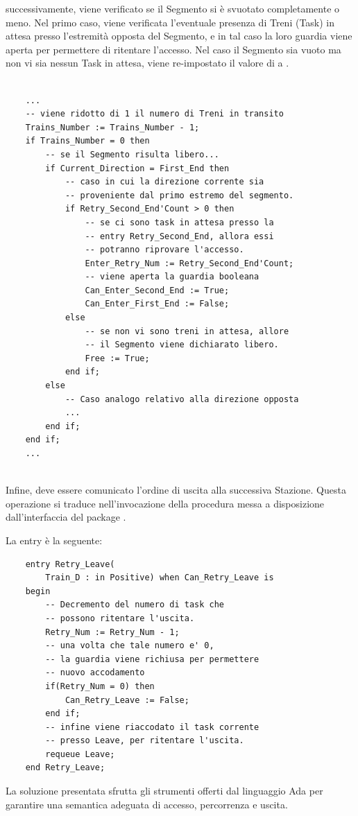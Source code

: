 	successivamente, viene verificato se il Segmento si è svuotato completamente o meno. Nel primo caso, viene verificata l'eventuale presenza di Treni (Task) in attesa presso l'estremità opposta del Segmento, e in tal caso la loro guardia viene aperta per permettere
di ritentare l'accesso. Nel caso il Segmento sia vuoto ma non vi sia nessun Task in attesa, viene re-impostato il valore di  a .

\begin{lstlisting}
	
	...
	-- viene ridotto di 1 il numero di Treni in transito
	Trains_Number := Trains_Number - 1;
	if Trains_Number = 0 then
		-- se il Segmento risulta libero...
		if Current_Direction = First_End then
			-- caso in cui la direzione corrente sia 
			-- proveniente dal primo estremo del segmento.
			if Retry_Second_End'Count > 0 then
				-- se ci sono task in attesa presso la
				-- entry Retry_Second_End, allora essi 
				-- potranno riprovare l'accesso.
				Enter_Retry_Num := Retry_Second_End'Count;
				-- viene aperta la guardia booleana
				Can_Enter_Second_End := True;
				Can_Enter_First_End := False;
			else
				-- se non vi sono treni in attesa, allore
				-- il Segmento viene dichiarato libero.
				Free := True;
			end if;
		else
			-- Caso analogo relativo alla direzione opposta
			...
		end if;
	end if;
	...
	
\end{lstlisting}
	
	Infine, deve essere comunicato l'ordine di uscita alla successiva Stazione. Questa operazione si traduce nell'invocazione della procedura  messa a disposizione dall'interfaccia  del package . 
	
	La entry  è la seguente:
	
\begin{lstlisting}
	entry Retry_Leave(
		Train_D : in Positive) when Can_Retry_Leave is
	begin
		-- Decremento del numero di task che
		-- possono ritentare l'uscita.
		Retry_Num := Retry_Num - 1;
		-- una volta che tale numero e' 0, 
		-- la guardia viene richiusa per permettere
		-- nuovo accodamento
		if(Retry_Num = 0) then
			Can_Retry_Leave := False;
		end if;
		-- infine viene riaccodato il task corrente
		-- presso Leave, per ritentare l'uscita.
		requeue Leave;
	end Retry_Leave;

\end{lstlisting}

La soluzione presentata sfrutta gli strumenti offerti dal linguaggio Ada per garantire una semantica adeguata di accesso, percorrenza e uscita.
	
